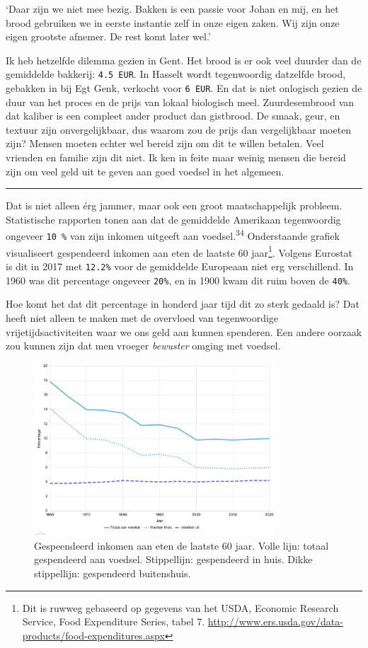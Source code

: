 \documentclass[
  11pt,
  dutch,
]{memoir}
\begin{document}
`Daar zijn we niet mee bezig. Bakken is een passie voor Johan en mij, en
het brood gebruiken we in eerste instantie zelf in onze eigen zaken. Wij
zijn onze eigen grootste afnemer. De rest komt later wel.'

Ik heb hetzelfde dilemma gezien in Gent. Het brood is er ook veel
duurder dan de gemiddelde bakkerij: \texttt{4.5\ EUR}. In Hasselt wordt
tegenwoordig datzelfde brood, gebakken in bij Egt Genk, verkocht voor
\texttt{6\ EUR}. En dat is niet onlogisch gezien de duur van het proces
en de prijs van lokaal biologisch meel. Zuurdesembrood van dat kaliber
is een compleet ander product dan gistbrood. De smaak, geur, en textuur
zijn onvergelijkbaar, dus waarom zou de prijs dan vergelijkbaar moeten
zijn? Mensen moeten echter wel bereid zijn om dit te willen betalen.
Veel vrienden en familie zijn dit niet. Ik ken in feite maar weinig
mensen die bereid zijn om veel geld uit te geven aan goed voedsel in het
algemeen.

\pfbreak

Dat is niet alleen érg jammer, maar ook een groot maatschappelijk
probleem. Statistische rapporten tonen aan dat de gemiddelde Amerikaan
tegenwoordig ongeveer \texttt{10\ \%} van zijn inkomen uitgeeft aan
voedsel.\textsuperscript{34} Onderstaande grafiek visualiseert
gespendeerd inkomen aan eten de laatste 60 jaar\footnote{Dit is ruwweg
  gebaseerd op gegevens van het USDA, Economic Research Service, Food
  Expenditure Series, tabel 7.
  \url{http://www.ers.usda.gov/data-products/food-expenditures.aspx}}.
Volgens Eurostat is dit in 2017 met \texttt{12.2\%} voor de gemiddelde
Europeaan niet erg verschillend. In 1960 was dit percentage ongeveer
\texttt{20\%}, en in 1900 kwam dit ruim boven de \texttt{40\%}.

Hoe komt het dat dit percentage in honderd jaar tijd dit zo sterk
gedaald is? Dat heeft niet alleen te maken met de overvloed van
tegenwoordige vrijetijdsactiviteiten waar we ons geld aan kunnen
spenderen. Een andere oorzaak zou kunnen zijn dat men vroeger
\emph{bewuster} omging met voedsel.

\begin{figure}
    \centering
    \includegraphics[width=0.8\textwidth,height=\textheight]{img/inkomen.png}
    \caption[Grafiek van gespeendeerd inkomen aan eten de laatste 60 jaar.]{Gespeendeerd inkomen aan eten de laatste 60 jaar. Volle lijn:
    totaal gespendeerd aan voedsel. Stippellijn: gespendeerd in huis. Dikke
    stippellijn: gespendeerd buitenshuis.}
\end{figure}
\end{document}
